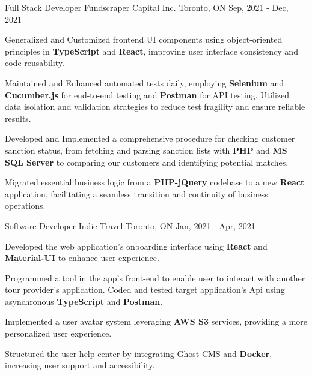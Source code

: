 \begin{cventries}
  \cventry
    {Full Stack Developer} %
    {Fundscraper Capital Inc.} %
    {Toronto, ON} %
    {Sep, 2021 - Dec, 2021} %
    {
		\begin{cvitems} %
			\item {Generalized and Customized frontend UI components using object-oriented principles in \textbf{TypeScript} and \textbf{React}, improving user interface consistency and code reusability.}
			\item {Maintained and Enhanced automated tests daily, employing \textbf{Selenium} and \textbf{Cucumber.js} for end-to-end testing and \textbf{Postman} for API testing. Utilized data isolation and validation strategies to reduce test fragility and ensure reliable results.}
			\item {Developed and Implemented a comprehensive procedure for checking customer sanction status, from fetching and parsing sanction lists with \textbf{PHP} and \textbf{MS SQL Server} to comparing our customers and identifying potential matches.}
			\item {Migrated essential business logic from a \textbf{PHP-jQuery} codebase to a new \textbf{React} application, facilitating a seamless transition and continuity of business operations.}
		\end{cvitems}
    }

  \cventry
	{Software Developer} %
	{Indie Travel} %
	{Toronto, ON} %
	{Jan, 2021 - Apr, 2021} %
	{
		\begin{cvitems} %
			\item {Developed the web application's onboarding interface using \textbf{React} and \textbf{Material-UI} to enhance user experience.}
			\item {Programmed a tool in the app's front-end to enable user to interact with another tour provider's application. Coded and tested target application's Api using asynchronous \textbf{TypeScript} and \textbf{Postman}.}
			\item {Implemented a user avatar system leveraging \textbf{AWS S3} services, providing a more personalized user experience.}
			\item {Structured the user help center by integrating Ghost CMS and \textbf{Docker}, increasing user support and accessibility.}
		\end{cvitems}
	}

\end{cventries}
